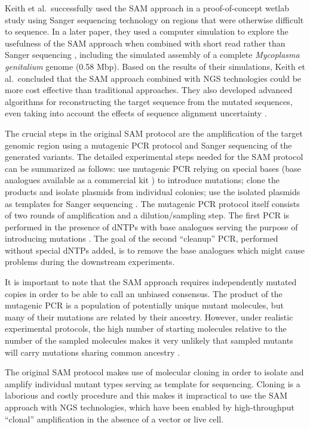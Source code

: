 \documentclass[10pt]{article}
\begin{document}
Keith et al.\ successfully used the SAM approach in a proof-of-concept wetlab study \cite{Keith2004} using Sanger sequencing technology on regions that were otherwise difficult to sequence. In a later paper, they used a computer simulation to explore the usefulness of the SAM approach when combined with short read rather than Sanger sequencing \cite{Keith2007}, including the simulated assembly of a complete \textit{Mycoplasma genitalium} genome (0.58 Mbp). Based on the results of their simulations, Keith et al.\ concluded that the SAM approach combined with NGS technologies could be more cost effective than traditional approaches. They also developed advanced algorithms for reconstructing the target sequence from the mutated sequences, even taking into account the effects of sequence alignment uncertainty \cite{Keith2004a}.

The crucial steps in the original SAM protocol are the amplification of the target genomic region using a mutagenic PCR protocol and Sanger sequencing of the generated variants.
The detailed experimental steps needed for the SAM protocol can be summarized as follows: use mutagenic PCR relying on special bases (base analogues \cite{Zaccolo1996} available as a commercial kit \cite{mutkit}) to introduce mutations; clone the products and isolate plasmids from individual colonies; use the isolated plasmids as templates for Sanger sequencing \cite{Keith2004}. The mutagenic PCR protocol itself consists of two rounds of amplification and a dilution/sampling step. The first PCR is performed in the presence of dNTPs with base analogues serving the purpose of introducing mutations \cite{Zaccolo1996}. The goal of the second ``cleanup'' PCR, performed without special dNTPs added, is to remove the base analogues which might cause problems during the downstream experiments.

It is important to note that the SAM approach requires independently mutated copies in order to be able to call an unbiased consensus.
The product of the mutagenic PCR is a population of potentially unique mutant molecules, but many of their mutations are related by their ancestry. However, under realistic experimental protocols, the high number of starting molecules relative to the number of the sampled molecules makes it very unlikely that sampled mutants will carry mutations sharing common ancestry \cite{Keith2004}.

The original SAM protocol makes use of molecular cloning \cite{Keith2004} in order to isolate and amplify individual mutant types serving as template for sequencing. Cloning is a laborious and costly procedure and this makes it impractical to use the SAM approach with NGS technologies, which have been enabled by high-throughput ``clonal'' amplification in the absence of a vector or live cell.
\end{document}
